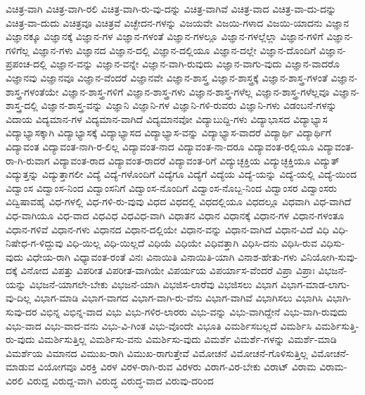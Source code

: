 {ವಿಚಿತ್ರ-ವಾಗಿ
ವಿಚಿತ್ರ-ವಾಗಿ-ರಲಿ
ವಿಚಿತ್ರ-ವಾಗಿ-ರು-ವು-ದನ್ನು
ವಿಚಿತ್ರ-ವಾಗಿವೆ
ವಿಚಿತ್ರ-ವಾದ
ವಿಚಿತ್ರ-ವಾ-ದು-ದನ್ನು
ವಿಚಿತ್ರ-ವಾ-ದುದು
ವಿಚಿತ್ರವೂ
ವಿಚಿತ್ರವೆ
ವಿಚ್ಛೇದನ-ಗಳನ್ನು
ವಿಜಯವೇ
ವಿಜಯಿ-ಗಳಾದ
ವಿಜಯಿ-ಯಾದನು
ವಿಜ್ಞಾನ
ವಿಜ್ಞಾನಕ್ಕೂ
ವಿಜ್ಞಾನಕ್ಕೆ
ವಿಜ್ಞಾನ-ಗಳ
ವಿಜ್ಞಾನ-ಗಳಂತೆ
ವಿಜ್ಞಾನ-ಗಳಲ್ಲೂ
ವಿಜ್ಞಾನ-ಗಳಲ್ಲೆಲ್ಲಾ
ವಿಜ್ಞಾನ-ಗಳಿಗೆ
ವಿಜ್ಞಾನ-ಗಳಿಗೆಲ್ಲ
ವಿಜ್ಞಾನ-ಗಳು
ವಿಜ್ಞಾನದ
ವಿಜ್ಞಾನ-ದಲ್ಲಿ
ವಿಜ್ಞಾನ-ದಲ್ಲಿಯೂ
ವಿಜ್ಞಾನ-ದಲ್ಲೇ
ವಿಜ್ಞಾನ-ದೊಂದಿಗೆ
ವಿಜ್ಞಾನ-ಪ್ರಪಂಚ-ದಲ್ಲಿ
ವಿಜ್ಞಾನ-ವನ್ನು
ವಿಜ್ಞಾನ-ವನ್ನೇ
ವಿಜ್ಞಾನ-ವಾಗಿ-ರುವುದು
ವಿಜ್ಞಾನ-ವಾಗು-ವುದು
ವಿಜ್ಞಾನ-ವಾದರೊ
ವಿಜ್ಞಾನವು
ವಿಜ್ಞಾನವೂ
ವಿಜ್ಞಾನ-ವೆಂದರೆ
ವಿಜ್ಞಾನವೇ
ವಿಜ್ಞಾನ-ಶಾಸ್ತ್ರ
ವಿಜ್ಞಾನ-ಶಾಸ್ತ್ರಕ್ಕೆ
ವಿಜ್ಞಾನ-ಶಾಸ್ತ್ರ-ಗಳಂತೆ
ವಿಜ್ಞಾನ-ಶಾಸ್ತ್ರ-ಗಳಂತೆಯೇ
ವಿಜ್ಞಾನ-ಶಾಸ್ತ್ರ-ಗಳಿಗೆ
ವಿಜ್ಞಾನ-ಶಾಸ್ತ್ರ-ಗಳು
ವಿಜ್ಞಾನ-ಶಾಸ್ತ್ರ-ಗಳೆಲ್ಲ
ವಿಜ್ಞಾನ-ಶಾಸ್ತ್ರ-ಗಳೆಲ್ಲವೂ
ವಿಜ್ಞಾನ-ಶಾಸ್ತ್ರ-ದಲ್ಲಿ
ವಿಜ್ಞಾನ-ಶಾಸ್ತ್ರ-ವನ್ನು
ವಿಜ್ಞಾನಿ
ವಿಜ್ಞಾನಿ-ಗಳ
ವಿಜ್ಞಾನಿ-ಗಳಿ-ರುವರು
ವಿಜ್ಞಾನಿ-ಗಳು
ವಿಡಂಬನೆ-ಗಳನ್ನು
ವಿದಾಯ
ವಿದ್ಯಮಾನ-ಗಳ
ವಿದ್ಯಮಾನ-ವಾಗಿದೆ
ವಿದ್ಯಮಾನವೋ
ವಿದ್ಯಾಬುದ್ದಿ-ಗಳು
ವಿದ್ಯಾಭಾಸದ
ವಿದ್ಯಾಭ್ಯಾಸ
ವಿದ್ಯಾಭ್ಯಾಸಕ್ಕಾಗಿ
ವಿದ್ಯಾಭ್ಯಾಸಕ್ಕೆ
ವಿದ್ಯಾಭ್ಯಾಸದ
ವಿದ್ಯಾಭ್ಯಾಸ-ವನ್ನು
ವಿದ್ಯಾಭ್ಯಾಸ-ವಾದರೆ
ವಿದ್ಯಾರ್ಥಿ
ವಿದ್ಯಾರ್ಥಿಗೆ
ವಿದ್ಯಾವಂತ
ವಿದ್ಯಾವಂತ-ನಾಗಿ-ರ-ಲಿಲ್ಲ
ವಿದ್ಯಾವಂತ-ನಾದ
ವಿದ್ಯಾವಂತ-ನಾ-ದರೂ
ವಿದ್ಯಾವಂತ-ರಲ್ಲಿಯೂ
ವಿದ್ಯಾವಂತ-ರಾ-ಗಿ-ರುವಾಗ
ವಿದ್ಯಾವಂತ-ರಾದ
ವಿದ್ಯಾವಂತ-ರಾದರೆ
ವಿದ್ಯಾವಂತ-ರಿಗೆ
ವಿದ್ಯುಚ್ಛಕ್ತಿಯ
ವಿದ್ಯುಚ್ಛಕ್ತಿಯೂ
ವಿದ್ಯುತ್
ವಿದ್ಯುತ್ತನ್ನು
ವಿದ್ಯುತ್ತಾಗಲೀ
ವಿದ್ಯೆ
ವಿದ್ಯೆ-ಗಳೊಂದಿಗೆ
ವಿದ್ಯೆಗೂ
ವಿದ್ಯೆಗೆ
ವಿದ್ಯೆಯ
ವಿದ್ಯೆ-ಯನ್ನು
ವಿದ್ಯೆ-ಯಲ್ಲಿ
ವಿದ್ಯೆ-ಯಿಂದ
ವಿದ್ವಾಂಸ
ವಿದ್ವಾಂಸ-ನಿಂದ
ವಿದ್ವಾಂಸನಿಗೆ
ವಿದ್ವಾಂಸ-ನೊಂದಿಗೆ
ವಿದ್ವಾಂಸ-ನೊಬ್ಬ-ನಿಂದ
ವಿದ್ವಾಂಸರ
ವಿದ್ವಾಂಸರು
ವಿದ್ವಿಷಾವಹೈ
ವಿಧ-ಗಳಲ್ಲಿ
ವಿಧ-ಗಳಿ-ರು-ವುವು
ವಿಧದ
ವಿಧದಲ್ಲಿ
ವಿಧದಲ್ಲಿಯೂ
ವಿಧದಲ್ಲೂ
ವಿಧವಾಗಿ
ವಿಧ-ವಾಗಿದೆ
ವಿಧ-ವಾಗಿಯೂ
ವಿಧ-ವಾದ
ವಿಧವಿಧ
ವಿಧವಿಧ-ವಾಗಿ
ವಿಧಾತನ
ವಿಧಾನ
ವಿಧಾನಕ್ಕೆ
ವಿಧಾನ-ಗಳ
ವಿಧಾನ-ಗಳಂತೂ
ವಿಧಾನ-ಗಳಿವೆ
ವಿಧಾನ-ಗಳು
ವಿಧಾನದ
ವಿಧಾನ-ದಲ್ಲಿಯೇ
ವಿಧಾನ-ವನ್ನು
ವಿಧಾನ-ವಾಗಿದೆ
ವಿಧಾನ-ವಿದೆ
ವಿಧಿ
ವಿಧಿ-ನಿಷೇಧ-ಗ-ಳಿದ್ದುವು
ವಿಧಿ-ಯಿಲ್ಲ
ವಿಧಿ-ಯಿಲ್ಲದೆ
ವಿಧಿಯೆ
ವಿಧಿಯೇ
ವಿಧಿವತ್ತಾಗಿ
ವಿಧಿಸಿ-ದನು
ವಿಧಿಸಿ-ರುವ
ವಿಧಿಸು-ವುದು
ವಿಧೇಯ-ರಾಗಿ
ವಿಧ್ಯಾವಂತ-ರಂತೆ
ವಿನಃ
ವಿನಾಯಿತಿ
ವಿನಾಯಿತಿ-ಯಾಗಿ
ವಿನಾಶ-ಹೇತು-ಗಳು
ವಿನಿಯೋಗಿ-ಸುವು-ದಕ್ಕೆ
ವಿನೋದ
ವಿಪತ್ತು
ವಿಪರೀತ
ವಿಪರೀತ-ವಾಗಿಯೇ
ವಿಪರ್ಯಯ
ವಿಪರ್ಯಾಸ-ವೆಂದರೆ
ವಿಪ್ರಾ
ವಿಪ್ರಾಃ
ವಿಭಜನೆ-ಯನ್ನು
ವಿಭಜನೆ-ಯಾಗಲೇ-ಬೇಕು
ವಿಭಜನೆ-ಯಾಗಿ
ವಿಭಜಿಸ-ಲಾರೆವು
ವಿಭಜಿಸಲು
ವಿಭಾಗ
ವಿಭಾಗ-ಮಾಡ-ಲಾಗು-ವು-ದಿಲ್ಲ
ವಿಭಾಗ-ಮಾಡಿ
ವಿಭಾಗ-ವಾಗದ
ವಿಭಾಗ-ವಾಗಿ-ರು-ವೆನು
ವಿಭಾಗ-ವಾಗಿವೆ
ವಿಭಾಗಿಸಲು
ವಿಭಾಗಿಸಿ
ವಿಭಾಗಿ-ಸುವು-ದರ
ವಿಭಿನ್ನ
ವಿಭಿನ್ನ-ವಾದ
ವಿಭು
ವಿಭು-ಗಳಿರ-ಲಾರರು
ವಿಭು-ವನ್ನು
ವಿಭು-ವಾಗಿದ್ದೇನೆ
ವಿಭು-ವಾಗಿ-ರುವುದು
ವಿಭು-ವಾದ
ವಿಭು-ವಾದ-ವನು
ವಿಭು-ವಿ-ಗಿಂತ
ವಿಭು-ವೊಂದೇ
ವಿಭೂತಿ
ವಿಮರ್ಶಿಸಬಲ್ಲದೆ
ವಿಮರ್ಶಿಸಿ
ವಿಮರ್ಶಿಸುತ್ತಿ-ರು-ವುದು
ವಿಮರ್ಶಿಸುತ್ತಿಲ್ಲ
ವಿಮರ್ಶಿಸು-ವನು
ವಿಮರ್ಶಿಸು-ವುದು
ವಿಮರ್ಶೆ
ವಿಮರ್ಶೆ-ಗಳನ್ನು
ವಿಮರ್ಶೆ-ಮಾಡಿ
ವಿಮರ್ಶೆಯ
ವಿಮಾನದ
ವಿಮುಖ-ರಾಗಿ
ವಿಮುಖ-ರಾಗುತ್ತೇವೆ
ವಿಮೋಚನೆ
ವಿಮೋಚನೆ-ಗೊಳಿಸುತ್ತಿಲ್ಲ
ವಿಮೋಚನೆ-ಮಾಡುವ
ವಿಯೋಗವೂ
ವಿರಕ್ತಿ
ವಿರಳ
ವಿರಳ-ರಾಗಿ-ರುವ
ವಿರಳರು
ವಿರಾಗ-ವಿರ-ಬೇಕು
ವಿರಾಟ್
ವಿರಾಮ
ವಿರಾಮ-ವಿರಲಿ
ವಿರುದ್ದ
ವಿರುದ್ದ-ವಾಗಿ
ವಿರುದ್ಧ
ವಿರುದ್ಧ-ವಾದ
ವಿರುವು-ದರಿಂದ
}
